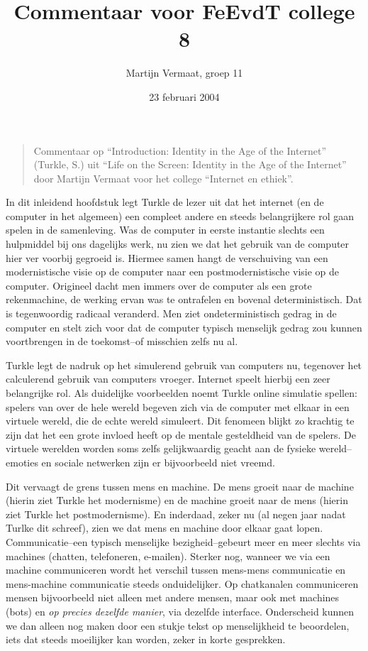 \documentclass[11pt]{article}
\title{Commentaar voor FeEvdT college 8}
\author{
    Martijn Vermaat, groep 11
}
\date{23 februari 2004}
\begin{document}
\maketitle

\begin{quote}
Commentaar op ``Introduction: Identity in the Age of the Internet'' (Turkle, S.) uit ``Life on the Screen: Identity in the Age of the Internet'' door Martijn Vermaat voor het college ``Internet en ethiek''.
\end{quote}


In dit inleidend hoofdstuk legt Turkle de lezer uit dat het internet (en de computer in het algemeen) een compleet andere en steeds belangrijkere rol gaan spelen in de samenleving.
Was de computer in eerste instantie slechts een hulpmiddel bij ons dagelijks werk, nu zien we dat het gebruik van de computer hier ver voorbij gegroeid is.
Hiermee samen hangt de verschuiving van een modernistische visie op de computer naar een postmodernistische visie op de computer.
Origineel dacht men immers over de computer als een grote rekenmachine, de werking ervan was te ontrafelen en bovenal deterministisch.
Dat is tegenwoordig radicaal veranderd.
Men ziet ondeterministisch gedrag in de computer en stelt zich voor dat de computer typisch menselijk gedrag zou kunnen voortbrengen in de toekomst--of misschien zelfs nu al.

Turkle legt de nadruk op het simulerend gebruik van computers nu, tegenover het calculerend gebruik van computers vroeger.
Internet speelt hierbij een zeer belangrijke rol.
Als duidelijke voorbeelden noemt Turkle online simulatie spellen: spelers van over de hele wereld begeven zich via de computer met elkaar in een virtuele wereld, die de echte wereld simuleert.
Dit fenomeen blijkt zo krachtig te zijn dat het een grote invloed heeft op de mentale gesteldheid van de spelers.
De virtuele werelden worden soms zelfs gelijkwaardig geacht aan de fysieke wereld--emoties en sociale netwerken zijn er bijvoorbeeld niet vreemd.

Dit vervaagt de grens tussen mens en machine.
De mens groeit naar de machine (hierin ziet Turkle het modernisme) en de machine groeit naar de mens (hierin ziet Turkle het postmodernisme).
En inderdaad, zeker nu (al negen jaar nadat Turlke dit schreef), zien we dat mens en machine door elkaar gaat lopen.
Communicatie--een typisch menselijke bezigheid--gebeurt meer en meer slechts via machines (chatten, telefoneren, e-mailen).
Sterker nog, wanneer we via een machine communiceren wordt het verschil tussen mens-mens communicatie en mens-machine communicatie steeds onduidelijker.
Op chatkanalen communiceren mensen bijvoorbeeld niet alleen met andere mensen, maar ook met machines (bots) en \emph{op precies dezelfde manier}, via dezelfde interface.
Onderscheid kunnen we dan alleen nog maken door een stukje tekst op menselijkheid te beoordelen, iets dat steeds moeilijker kan worden, zeker in korte gesprekken.
\end{document}
